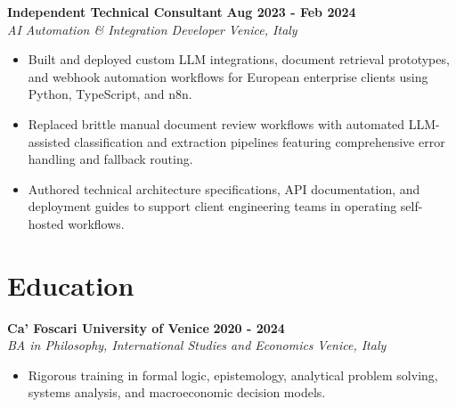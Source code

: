 \documentclass[10pt,a4paper]{article}
\newcommand{\role}[4]{%
  \textbf{#1} \hfill \textbf{#2}\\[1pt]%
  \textit{#3} \hfill \textit{#4}\\[2pt]%
}
\begin{document}
\role{Independent Technical Consultant}{Aug 2023 - Feb 2024}{AI Automation \& Integration Developer}{Venice, Italy}
\begin{itemize}
  \item Built and deployed custom LLM integrations, document retrieval prototypes, and webhook automation workflows for European enterprise clients using Python, TypeScript, and n8n.
  \item Replaced brittle manual document review workflows with automated LLM-assisted classification and extraction pipelines featuring comprehensive error handling and fallback routing.
  \item Authored technical architecture specifications, API documentation, and deployment guides to support client engineering teams in operating self-hosted workflows.
\end{itemize}

\section{Education}
\role{Ca' Foscari University of Venice}{2020 - 2024}{BA in Philosophy, International Studies and Economics}{Venice, Italy}
\begin{itemize}
  \item Rigorous training in formal logic, epistemology, analytical problem solving, systems analysis, and macroeconomic decision models.
\end{itemize}
\end{document}
